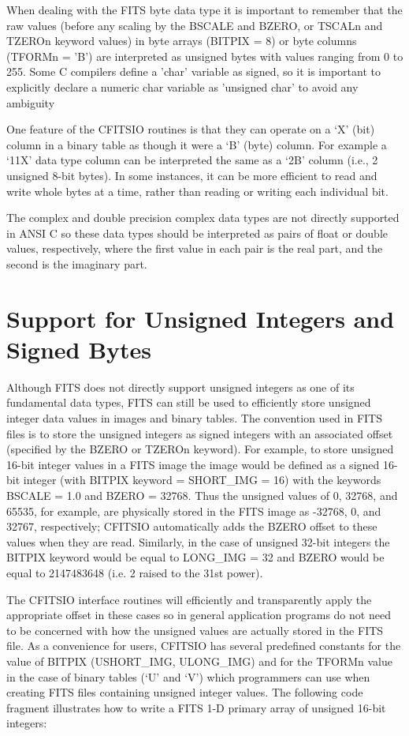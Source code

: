 \documentclass[11pt]{book}
\begin{document}
When dealing with the FITS byte data type it is important to remember
that the raw values (before any scaling by the BSCALE and BZERO, or
TSCALn and TZEROn keyword values) in byte arrays (BITPIX = 8) or byte
columns (TFORMn = 'B') are interpreted as unsigned bytes with values
ranging from 0 to 255.  Some C compilers define a 'char' variable as
signed, so it is important to explicitly declare a numeric char
variable as 'unsigned char' to avoid any ambiguity

One feature of the CFITSIO routines is that they can operate on a `X'
(bit) column in a binary table as though it were a `B' (byte) column.
For example a `11X' data type column can be interpreted the same as a
`2B' column (i.e., 2 unsigned 8-bit bytes).  In some instances, it can
be more efficient to read and write whole bytes at a time, rather than
reading or writing each individual bit.

The complex and double precision complex data types are not directly
supported in ANSI C so these data types should be interpreted as pairs
of float or double values, respectively, where the first  value in each
pair is the real part, and the second is the imaginary part.


\section{Support for Unsigned Integers and Signed Bytes}

Although FITS does not directly support unsigned integers as one of its
fundamental data types, FITS can still be used to efficiently store
unsigned integer data values in images and binary tables.  The
convention used in FITS files is to store the unsigned integers as
signed integers with an associated offset (specified by the BZERO or
TZEROn keyword).  For example, to store unsigned 16-bit integer values
in a FITS image the image would be defined as a signed 16-bit integer
(with BITPIX keyword = SHORT\_IMG = 16) with the keywords BSCALE = 1.0
and BZERO = 32768.  Thus the unsigned values of 0, 32768, and 65535,
for example, are physically stored in the FITS image as -32768, 0, and
32767, respectively;  CFITSIO automatically adds the BZERO offset to
these values when they are read.  Similarly, in the case of unsigned
32-bit integers the BITPIX keyword would be equal to LONG\_IMG = 32 and
BZERO would be equal to 2147483648 (i.e. 2 raised to the 31st power).

The CFITSIO interface routines will efficiently and transparently apply
the appropriate offset in these cases so in general application
programs do not need to be concerned with how the unsigned values are
actually stored in the FITS file.  As a convenience for users, CFITSIO
has several predefined constants for the value of BITPIX  (USHORT\_IMG,
ULONG\_IMG) and for the TFORMn value in the case of binary tables (`U'
and `V') which programmers can use when creating FITS files containing
unsigned integer values.  The following code fragment illustrates how
to write a FITS 1-D primary array of unsigned 16-bit integers:
\end{document}

